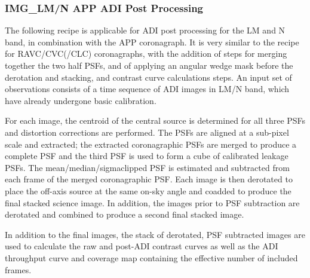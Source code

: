 \subsubsection{IMG\_LM/N APP ADI Post Processing}
\label{sssec:adi_img_app}


The following recipe is applicable for ADI post processing for the LM
and N band, in combination with the APP coronagraph. It is very
similar to the recipe for RAVC/CVC(/CLC) coronagraphs, with the
addition of steps for merging together the two half PSFs, and of
applying an angular wedge mask before the derotation and stacking, and
contrast curve calculations steps. An input set of observations
consists of a time sequence of ADI images in LM/N band, which have
already undergone basic calibration.

For each image, the centroid of the central source is determined for
all three PSFs and distortion corrections are performed. The PSFs are
aligned at a sub-pixel scale and extracted; the extracted
coronagraphic PSFs are merged to produce a complete PSF and the third
PSF is used to form a cube of calibrated leakage PSFs.  The
mean/median/sigmaclipped PSF is estimated and subtracted from each
frame of the merged coronagraphic PSF. Each image is then derotated to
place the off-axis source at the same on-sky angle and coadded to
produce the final stacked science image. In addition, the images prior
to PSF subtraction are derotated and combined to produce a second
final stacked image.

In addition to the final images, the stack of derotated, PSF
subtracted images are used to calculate the raw and post-ADI contrast
curves as well as the ADI throughput curve and coverage map containing
the effective number of included frames.





